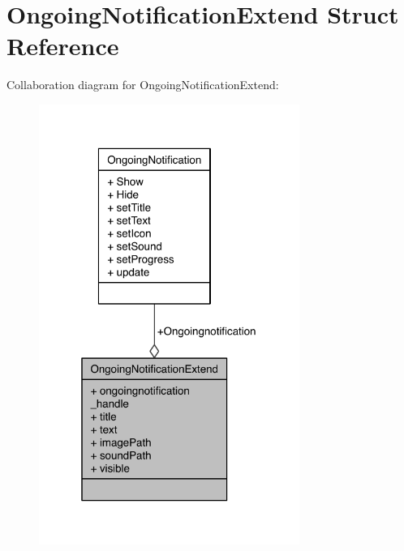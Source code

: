 \section{Ongoing\-Notification\-Extend Struct Reference}
\label{structOngoingNotificationExtend}


Collaboration diagram for Ongoing\-Notification\-Extend\-:\nopagebreak
\begin{figure}[H]
\begin{center}
\leavevmode
\includegraphics[width=241pt]{structOngoingNotificationExtend__coll__graph}
\end{center}
\end{figure}
